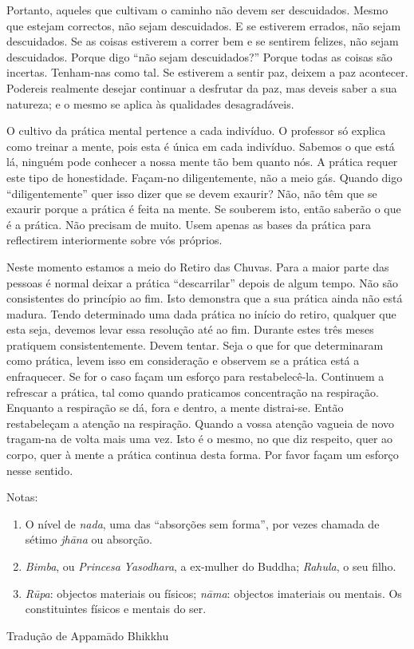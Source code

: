 Portanto, aqueles que cultivam o caminho não devem ser descuidados.
Mesmo que estejam correctos, não sejam descuidados. E se estiverem
errados, não sejam descuidados. Se as coisas estiverem a correr bem e se
sentirem felizes, não sejam descuidados. Porque digo ``não sejam
descuidados?'' Porque todas as coisas são incertas. Tenham-nas como tal.
Se estiverem a sentir paz, deixem a paz acontecer. Podereis realmente
desejar continuar a desfrutar da paz, mas deveis saber a sua natureza; e
o mesmo se aplica às qualidades desagradáveis.

O cultivo da prática mental pertence a cada indivíduo. O professor só
explica como treinar a mente, pois esta é única em cada indivíduo.
Sabemos o que está lá, ninguém pode conhecer a nossa mente tão bem
quanto nós. A prática requer este tipo de honestidade. Façam-no
diligentemente, não a meio gás. Quando digo ``diligentemente'' quer isso
dizer que se devem exaurir? Não, não têm que se exaurir porque a prática
é feita na mente. Se souberem isto, então saberão o que é a prática. Não
precisam de muito. Usem apenas as bases da prática para reflectirem
interiormente sobre vós próprios.

Neste momento estamos a meio do Retiro das Chuvas. Para a maior parte
das pessoas é normal deixar a prática ``descarrilar'' depois de algum
tempo. Não são consistentes do princípio ao fim. Isto demonstra que a
sua prática ainda não está madura. Tendo determinado uma dada prática no
início do retiro, qualquer que esta seja, devemos levar essa resolução
até ao fim. Durante estes três meses pratiquem consistentemente. Devem
tentar. Seja o que for que determinaram como prática, levem isso em
consideração e observem se a prática está a enfraquecer. Se for o caso
façam um esforço para restabelecê-la. Continuem a refrescar a prática,
tal como quando praticamos concentração na respiração. Enquanto a
respiração se dá, fora e dentro, a mente distrai-se. Então restabeleçam
a atenção na respiração. Quando a vossa atenção vagueia de novo
tragam-na de volta mais uma vez. Isto é o mesmo, no que diz respeito,
quer ao corpo, quer à mente a prática continua desta forma. Por favor
façam um esforço nesse sentido.

Notas:

\begin{enumerate}
\def\labelenumi{\arabic{enumi}.}
\item
  O nível de \emph{nada}, uma das ``absorções sem forma'', por vezes
  chamada de sétimo \emph{jhāna} ou absorção.
\item
  \emph{Bimba}, ou \emph{Princesa} \emph{Yasodhara}, a ex-mulher do
  Buddha; \emph{Rahula}, o seu filho.
\item
  \emph{Rūpa}: objectos materiais ou físicos; \emph{nāma}: objectos
  imateriais ou mentais. Os constituintes físicos e mentais do ser.
\end{enumerate}

Tradução de Appamādo Bhikkhu
